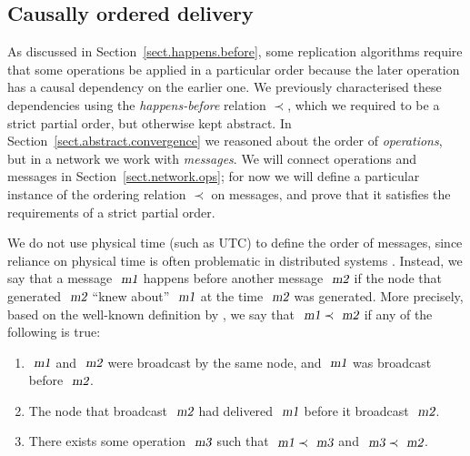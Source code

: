 \subsection{Causally ordered delivery}\label{sect.network.causal}

As discussed in Section~\ref{sect.happens.before}, some replication algorithms require that some operations be applied in a particular order because the later operation has a causal dependency on the earlier one.
We previously characterised these dependencies using the \emph{happens-before} relation $\prec$, which we required to be a strict partial order, but otherwise kept abstract.
In Section~\ref{sect.abstract.convergence} we reasoned about the order of \emph{operations}, but in a network we work with \emph{messages}.
We will connect operations and messages in Section~\ref{sect.network.ops}; for now we will define a particular instance of the ordering relation $\prec$ on messages, and prove that it satisfies the requirements of a strict partial order.

We do not use physical time (such as UTC) to define the order of messages, since reliance on physical time is often problematic in distributed systems \cite{Sheehy:2015jm}.
Instead, we say that a message $\isa{m1}$ happens before another message $\isa{m2}$ if the node that generated $\isa{m2}$ ``knew about'' $\isa{m1}$ at the time $\isa{m2}$ was generated.
More precisely, based on the well-known definition by \citet{Lamport:1978jq}, we say that $\isa{m1}\prec\isa{m2}$ if any of the following is true:
\begin{enumerate}
\item $\isa{m1}$ and $\isa{m2}$ were broadcast by the same node, and $\isa{m1}$ was broadcast before $\isa{m2}$.
\item The node that broadcast $\isa{m2}$ had delivered $\isa{m1}$ before it broadcast $\isa{m2}$.
\item There exists some operation $\isa{m3}$ such that $\isa{m1} \prec \isa{m3}$ and $\isa{m3} \prec \isa{m2}$.
\end{enumerate}

